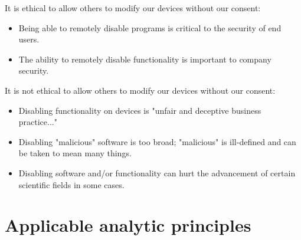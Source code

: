\documentclass[11pt]{article}
\begin{document}
It is ethical to allow others to modify our devices without our consent:
\begin{itemize}
\item Being able to remotely disable programs is critical to the security of end users. \cite{AndroidBlog} \cite{iPhoneKill}
\item The ability to remotely disable functionality is important to company security. \cite{sonySupercomputer}
\end{itemize}

It is not ethical to allow others to modify our devices without our consent:
\begin{itemize}
\item Disabling functionality on devices is "unfair and deceptive business practice..." \cite{sonyLawsuit2}
\item Disabling "malicious" software is too broad; "malicious" is ill-defined and can be taken to mean many things. \cite{iPhoneKill}
\item Disabling software and/or functionality can hurt the advancement of certain scientific fields in some cases. \cite{sonySupercomputer}
\end{itemize}

\section{Applicable analytic principles}
\end{document}
